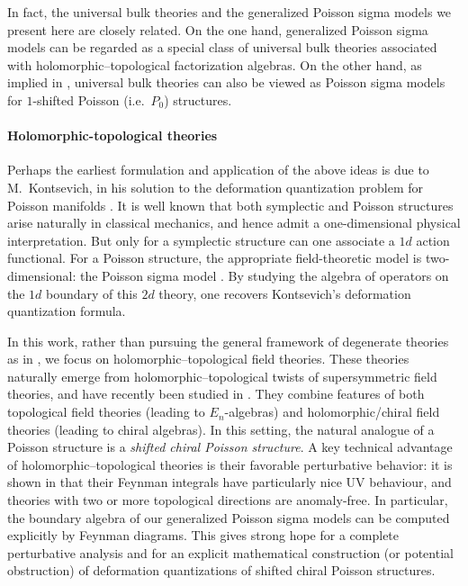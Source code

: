 \documentclass[11pt]{article}
\numberwithin{equation}{section}
\begin{document}
In fact, the universal bulk theories and the generalized Poisson sigma models we present here are closely related. On the one hand, generalized Poisson sigma models can be regarded as a special class of universal bulk theories associated with holomorphic--topological factorization algebras. On the other hand, as implied in \cite{butson2016degenerate}, universal bulk theories can also be viewed as Poisson sigma models for $1$-shifted Poisson (i.e.\ $P_0$) structures.

\paragraph{Holomorphic-topological theories}
Perhaps the earliest formulation and application of the above ideas is due to M.~Kontsevich, in his solution to the deformation quantization problem for Poisson manifolds \cite{Kontsevich:1997vb}. It is well known that both symplectic and Poisson structures arise naturally in classical mechanics, and hence admit a one-dimensional physical interpretation. But only for a symplectic structure can one associate a $1d$ action functional. For a Poisson structure, the appropriate field-theoretic model is two-dimensional: the Poisson sigma model \cite{Cattaneo:1999fm,Cattaneo:2001bp}. By studying the algebra of operators on the $1d$ boundary of this $2d$ theory, one recovers Kontsevich’s deformation quantization formula.

In this work, rather than pursuing the general framework of degenerate theories as in \cite{butson2016degenerate}, we focus on holomorphic--topological field theories. These theories naturally emerge from holomorphic--topological twists of supersymmetric field theories, and have recently been studied in \cite{budzik2024semi,Gaiotto:2024gii}. They combine features of both topological field theories (leading to $E_n$-algebras) and holomorphic/chiral field theories (leading to chiral algebras). In this setting, the natural analogue of a Poisson structure is a \emph{shifted chiral Poisson structure}. A key technical advantage of holomorphic--topological theories is their favorable perturbative behavior: it is shown in \cite{budzik2023feynman,wang2024factorization} that their Feynman integrals have particularly nice UV behaviour, and theories with two or more topological directions are anomaly-free. In particular, the boundary algebra of our generalized Poisson sigma models can be computed explicitly by Feynman diagrams. This gives strong hope for a complete perturbative analysis and for an explicit mathematical construction (or potential obstruction) of deformation quantizations of shifted chiral Poisson structures.
	
\end{document}

